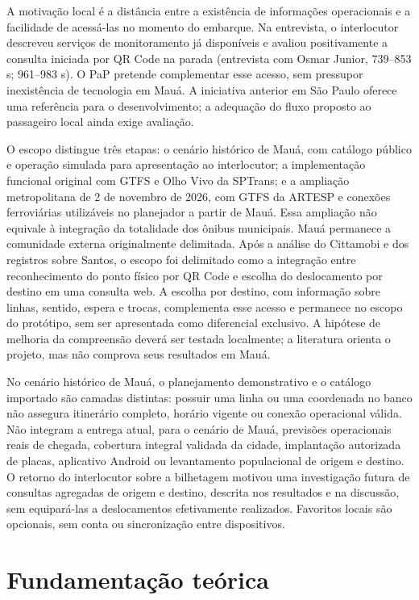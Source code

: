\documentclass[12pt,oneside,a4paper,brazil,chapter=TITLE]{abntex2}
\let\papsection\section
\renewcommand{\section}{\clearpage\papsection}
\begin{document}
A motivação local é a distância entre a existência de informações operacionais e a facilidade de acessá-las no momento do embarque. Na entrevista, o interlocutor descreveu serviços de monitoramento já disponíveis e avaliou positivamente a consulta iniciada por QR Code na parada  (entrevista com Osmar Junior, 739--853 s; 961--983 s). O PaP pretende complementar esse acesso, sem pressupor inexistência de tecnologia em Mauá. A iniciativa anterior em São Paulo oferece uma referência para o desenvolvimento; a adequação do fluxo proposto ao passageiro local ainda exige avaliação.

O escopo distingue três etapas: o cenário histórico de Mauá, com catálogo público e operação simulada para apresentação ao interlocutor; a implementação funcional original com GTFS e Olho Vivo da SPTrans; e a ampliação metropolitana de 2 de novembro de 2026, com GTFS da ARTESP e conexões ferroviárias utilizáveis no planejador a partir de Mauá. Essa ampliação não equivale à integração da totalidade dos ônibus municipais. Mauá permanece a comunidade externa originalmente delimitada. Após a análise do Cittamobi e dos registros sobre Santos, o escopo foi delimitado como a integração entre reconhecimento do ponto físico por QR Code e escolha do deslocamento por destino em uma consulta web. A escolha por destino, com informação sobre linhas, sentido, espera e trocas, complementa esse acesso e permanece no escopo do protótipo, sem ser apresentada como diferencial exclusivo. A hipótese de melhoria da compreensão deverá ser testada localmente; a literatura orienta o projeto, mas não comprova seus resultados em Mauá.

No cenário histórico de Mauá, o planejamento demonstrativo e o catálogo importado são camadas distintas: possuir uma linha ou uma coordenada no banco não assegura itinerário completo, horário vigente ou conexão operacional válida. Não integram a entrega atual, para o cenário de Mauá, previsões operacionais reais de chegada, cobertura integral validada da cidade, implantação autorizada de placas, aplicativo Android ou levantamento populacional de origem e destino. O retorno do interlocutor sobre a bilhetagem motivou uma investigação futura de consultas agregadas de origem e destino, descrita nos resultados e na discussão, sem equipará-las a deslocamentos efetivamente realizados. Favoritos locais são opcionais, sem conta ou sincronização entre dispositivos.

\section{Fundamentação teórica}
\end{document}
